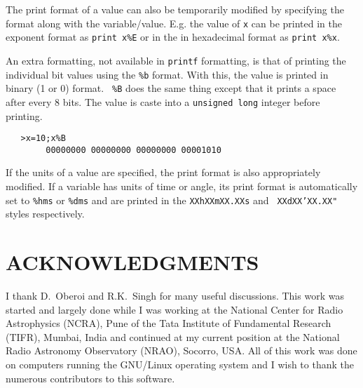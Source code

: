 \documentclass[11pt]{article}
\begin{document}
The print format of a value can also be temporarily modified by
specifying the format along with the variable/value.  E.g. the value
of {\tt x} can be printed in the exponent format as {\tt print x\%E}
or in the in hexadecimal format as {\tt print x\%x}.

An extra formatting, not available in {\tt printf} formatting, is that
of printing the individual bit values using the {\tt \%b} format.
With this, the value is printed in binary (1 or 0) format.  {\tt
\%B} does the same thing except that it prints a space after every 8 bits.
The value is caste into a {\tt unsigned long} integer before
printing.
\begin{verbatim}
   >x=10;x%B
        00000000 00000000 00000000 00001010
\end{verbatim}
If the units of a value are specified, the print format is also
appropriately modified.  If a variable has units of time or angle, its
print format is automatically set to {\tt \%hms} or {\tt \%dms}
and are printed in the {\tt XXhXXmXX.XXs} and {\tt
XXdXX{\texttt{'}}XX.XX{\texttt{"}}} styles respectively.


\section*{ACKNOWLEDGMENTS}
I thank D.~Oberoi and R.K.~Singh for many useful discussions.  This
work was started and largely done while I was working at the National
Center for Radio Astrophysics (NCRA), Pune of the Tata Institute of
Fundamental Research (TIFR), Mumbai, India and continued at my current
position at the National Radio Astronomy Observatory (NRAO), Socorro,
USA.  All of this work was done on computers running the GNU/Linux
operating system and I wish to thank the numerous contributors to this
software.

%




\end{document}
